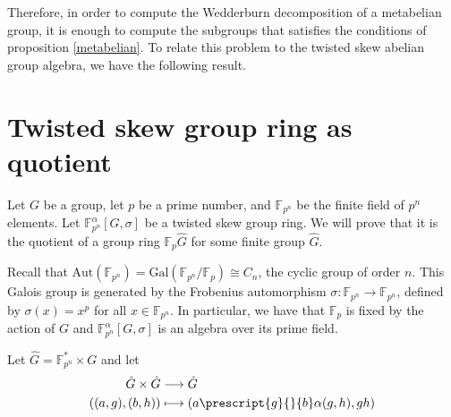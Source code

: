 \documentclass{article}
\begin{document}
Therefore, in order to compute the Wedderburn decomposition of a metabelian group, it is enough to compute the subgroups that satisfies the conditions of proposition \ref{metabelian}. To relate this problem to the twisted skew abelian group algebra, we have the following result.

\section{Twisted skew group ring as quotient}

Let $G$ be a group, let $p$ be a prime number, and $\mathbb{F}_{p^n}$ be the finite field of $p^n$ elements. Let $\mathbb{F}_{p^n}^\alpha[G,\sigma]$ be a twisted skew group ring. We will prove that it is the quotient of a group ring $\mathbb{F}_p \hat{G}$ for some finite group $\hat{G}$. 

Recall that $\mathrm{Aut}(\mathbb{F}_{p^n}) = \mathrm{Gal}(\mathbb{F}_{p^n}/\mathbb{F}_p) \cong C_n$, the cyclic group of order $n$. This Galois group is generated by the Frobenius automorphism $\sigma \colon \mathbb{F}_{p^n} \longrightarrow \mathbb{F}_{p^n}$, defined by $\sigma(x) = x^p$ for all $x \in \mathbb{F}_{p^n}$. In particular, we have that $\mathbb{F}_p$ is fixed by the action of $G$ and $\mathbb{F}_{p^n}^\alpha[G,\sigma]$ is an algebra over its prime field.

Let $\hat{G}= \mathbb{F}_{p^n}^* \times G$ and let 
\begin{align*}
    \hat{G} \times \hat{G} & \longrightarrow \hat{G} \\
    ((a,g),(b,h)) & \longmapsto (a \prescript{g}{}{b} \alpha(g,h) , gh)
\end{align*}
\end{document}
